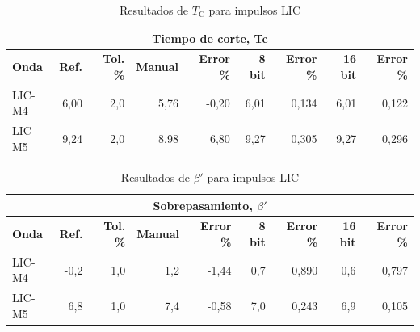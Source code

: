 \vspace{3\baselineskip}
\begin{table}[H]
    \centering
    \begin{tabular}{@{}lrrrrrrrr@{}}
        \toprule
        \multicolumn{9}{c}{\textbf{Tiempo de corte, Tc}}                                                                                                                  \\ \midrule
        \textbf{Onda} & \textbf{Ref.} & \textbf{Tol. \%} & \textbf{Manual} & \textbf{Error \%} & \textbf{8 bit} & \textbf{Error \%} & \textbf{16 bit} & \textbf{Error \%} \\ \midrule
        LIC-M4        & 6,00          & 2,0              & 5,76            & -0,20             & 6,01           & 0,134             & 6,01            & 0,122             \\ \midrule
        LIC-M5        & 9,24          & 2,0              & 8,98            & 6,80              & 9,27           & 0,305             & 9,27            & 0,296             \\ \bottomrule
    \end{tabular}
    \caption{Resultados de $T_\text{C}$ para impulsos LIC}
    \label{tab:resultados_tc_lic}
\end{table}
\vspace{3\baselineskip}

\vspace{3\baselineskip}
\begin{table}[H]
    \centering
    \begin{tabular}{@{}lrrrrrrrr@{}}
        \toprule
        \multicolumn{9}{c}{\textbf{Sobrepasamiento, $\beta'$}}                                                                                                                \\ \midrule
        \textbf{Onda} & \textbf{Ref.} & \textbf{Tol. \%} & \textbf{Manual} & \textbf{Error \%} & \textbf{8 bit} & \textbf{Error \%} & \textbf{16 bit} & \textbf{Error \%} \\ \midrule
        LIC-M4        & -0,2          & 1,0              & 1,2             & -1,44             & 0,7            & 0,890             & 0,6             & 0,797             \\ \midrule
        LIC-M5        & 6,8           & 1,0              & 7,4             & -0,58             & 7,0            & 0,243             & 6,9             & 0,105             \\ \bottomrule
    \end{tabular}
    \caption{Resultados de $\beta'$ para impulsos LIC}
    \label{tab:resultados_os_lic}
\end{table}
\vspace{3\baselineskip}

